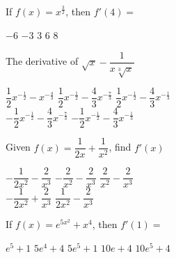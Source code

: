 \begin{questions}
    \question If $f(x) = x^\frac{3}{2}$, then $f'(4) = $ \\
    
    \begin{oneparchoices}
        \choice $-6$ 
        \choice $-3$ 
        \choice $3$
        \choice $6$
        \choice $8$
    \end{oneparchoices} \par \horizontalline

    \question The derivative of $\sqrt x - \dfrac{1}{x\sqrt[3]{x}}$ \\

    \begin{oneparchoices}
        \choice $\dfrac{1}{2}x^{-\frac{1}{2}} - x^{-\frac{4}{3}}$
        \choice $\dfrac{1}{2}x^{-\frac{1}{2}} - \dfrac{4}{3}x^{-\frac{7}{3}}$ 
        \choice $\dfrac{1}{2}x^{-\frac{1}{2}} - \dfrac{4}{3}x^{-\frac{1}{3}}$ \\[11pt]
        \makebox[0.2 \textwidth] \choice $-\dfrac{1}{2}x^{-\frac{1}{2}} - \dfrac{4}{3}x^{-\frac{7}{3}}$ 
        \makebox[0.25 \textwidth] \choice $-\dfrac{1}{2}x^{-\frac{1}{2}} - \dfrac{4}{3}x^{-\frac{1}{3}}$
    \end{oneparchoices} \par \horizontalline

    \question Given $f(x) = \dfrac{1}{2x} + \dfrac{1}{x^2}$, find $f'(x)$ \\

    \begin{oneparchoices}
        \choice $-\dfrac{1}{2x^2} - \dfrac{2}{x^3}$ 
        \choice $-\dfrac{2}{x^2} - \dfrac{2}{x^3}$
        \choice $\dfrac{2}{x^2} - \dfrac{2}{x^3}$ \\
        \makebox[0.23 \textwidth] \choice $-\dfrac{1}{2x^2} + \dfrac{2}{x^3}$
        \makebox[0.29 \textwidth] \choice $\dfrac{1}{2x^2} - \dfrac{2}{x^3}$
    \end{oneparchoices} \par \horizontalline

    \question If $f(x) = e^{5x^2} + x^4$, then $f'(1) = $ \\

    \begin{oneparchoices}
        \choice $e^5 + 1$
        \choice $5e^4 + 4$ 
        \choice $5e^5 + 1$
        \choice $10e + 4$
        \choice $10e^5 + 4$
    \end{oneparchoices} \par \horizontalline


\end{questions}
